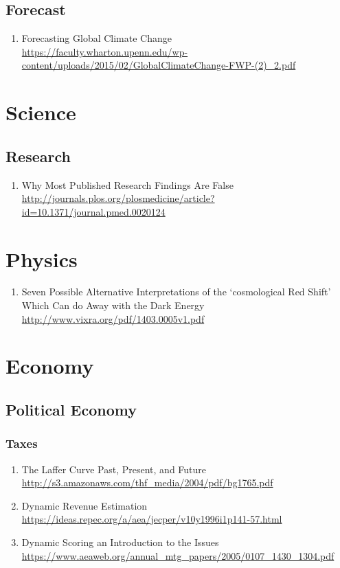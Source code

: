 \documentclass{article}
\begin{document}
\subsection{Forecast}
\begin{enumerate}
	\item {Forecasting Global Climate Change\\
\url{https://faculty.wharton.upenn.edu/wp-content/uploads/2015/02/GlobalClimateChange-FWP-(2)_2.pdf}}
\end{enumerate}

\section{Science}

\subsection{Research}
\begin{enumerate}
	\item {Why Most Published Research Findings Are False\\
	\url{http://journals.plos.org/plosmedicine/article?id=10.1371/journal.pmed.0020124}}
\end{enumerate}
\section{Physics}
\begin{enumerate}
	\item {Seven Possible Alternative Interpretations of the ‘cosmological Red Shift’ Which Can do Away with the Dark Energy\\
\url{http://www.vixra.org/pdf/1403.0005v1.pdf}}
\end{enumerate}
\section{Economy}
\subsection {Political Economy}
\subsubsection{Taxes}
\begin{enumerate}
	\item {The Laffer Curve Past, Present, and Future\\
\url{http://s3.amazonaws.com/thf_media/2004/pdf/bg1765.pdf}}
	\item {Dynamic Revenue Estimation\\
\url{https://ideas.repec.org/a/aea/jecper/v10y1996i1p141-57.html}}
	\item {Dynamic Scoring an Introduction to the Issues\\
\url{https://www.aeaweb.org/annual_mtg_papers/2005/0107_1430_1304.pdf}}
\end{enumerate}
\end{document}

